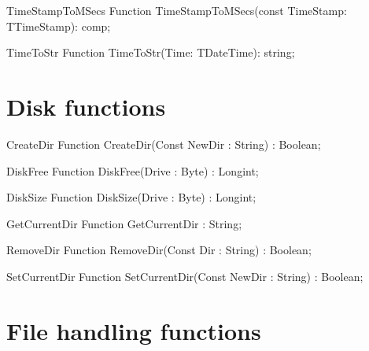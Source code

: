  
\begin{function}{TimeStampToMSecs}
\Declaration
Function TimeStampToMSecs(const TimeStamp: TTimeStamp): comp;
\Description
\Errors
\SeeAlso
\end{function}

 
\begin{function}{TimeToStr}
\Declaration
Function TimeToStr(Time: TDateTime): string;
\Description
\Errors
\SeeAlso
\end{function}

 

\section{Disk functions}

\begin{function}{CreateDir}
\Declaration
Function CreateDir(Const NewDir : String) : Boolean;
\Description
\Errors
\SeeAlso
\end{function}

 
\begin{function}{DiskFree}
\Declaration
Function DiskFree(Drive : Byte) : Longint;
\Description
\Errors
\SeeAlso
\end{function}

 
\begin{function}{DiskSize}
\Declaration
Function DiskSize(Drive : Byte) : Longint;
\Description
\Errors
\SeeAlso
\end{function}

 
\begin{function}{GetCurrentDir}
\Declaration
Function GetCurrentDir : String;
\Description
\Errors
\SeeAlso
\end{function}

 
\begin{function}{RemoveDir}
\Declaration
Function RemoveDir(Const Dir : String) : Boolean;
\Description
\Errors
\SeeAlso
\end{function}

 
\begin{function}{SetCurrentDir}
\Declaration
Function SetCurrentDir(Const NewDir : String) : Boolean;
\Description
\Errors
\SeeAlso
\end{function}

 


\section{File handling functions}

